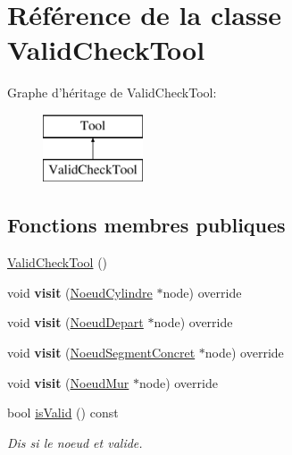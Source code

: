 \hypertarget{class_valid_check_tool}{\section{Référence de la classe Valid\-Check\-Tool}
\label{class_valid_check_tool}
}
Graphe d'héritage de Valid\-Check\-Tool\-:\begin{figure}[H]
\begin{center}
\leavevmode
\includegraphics[height=2.000000cm]{class_valid_check_tool}
\end{center}
\end{figure}
\subsection*{Fonctions membres publiques}
\begin{DoxyCompactItemize}
\item 
\hyperlink{group__inf2990_ga4e827b025969ce7fa8204c6a62cf27c6}{Valid\-Check\-Tool} ()
\item 
\hypertarget{group__inf2990_ga032c8fa96e75b6300ce0ad8692250c0c}{void {\bfseries visit} (\hyperlink{class_noeud_cylindre}{Noeud\-Cylindre} $\ast$node) override}\label{group__inf2990_ga032c8fa96e75b6300ce0ad8692250c0c}

\item 
\hypertarget{group__inf2990_gab3f77ff9294703aa3b3806c505421136}{void {\bfseries visit} (\hyperlink{class_noeud_depart}{Noeud\-Depart} $\ast$node) override}\label{group__inf2990_gab3f77ff9294703aa3b3806c505421136}

\item 
\hypertarget{group__inf2990_ga78a2a77e640811375ddcf280792bc9ce}{void {\bfseries visit} (\hyperlink{class_noeud_segment_concret}{Noeud\-Segment\-Concret} $\ast$node) override}\label{group__inf2990_ga78a2a77e640811375ddcf280792bc9ce}

\item 
\hypertarget{group__inf2990_gad91e261311122bc94172813602534772}{void {\bfseries visit} (\hyperlink{class_noeud_mur}{Noeud\-Mur} $\ast$node) override}\label{group__inf2990_gad91e261311122bc94172813602534772}

\item 
bool \hyperlink{group__inf2990_ga8917a37ee52e2661d510c79a43a4032d}{is\-Valid} () const 
\begin{DoxyCompactList}\small\item\em Dis si le noeud et valide. \end{DoxyCompactList}\end{DoxyCompactItemize}
